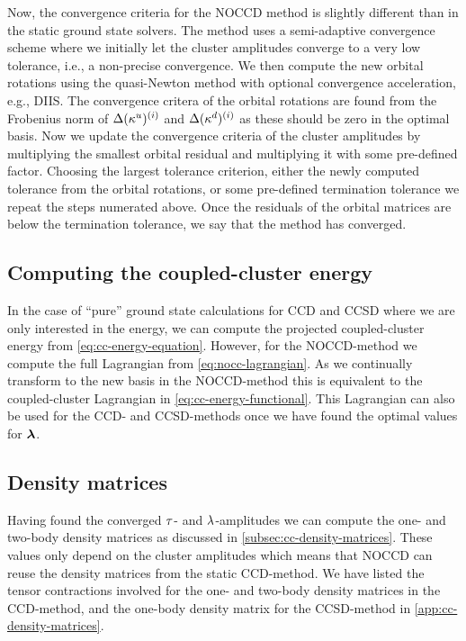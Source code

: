             Now, the convergence criteria for the NOCCD method is slightly
            different than in the static ground state solvers.
            The method uses a semi-adaptive convergence scheme where we
            initially let the cluster amplitudes converge to a very low
            tolerance, i.e., a non-precise convergence.
            We then compute the new orbital rotations using the quasi-Newton
            method with optional convergence acceleration, e.g., DIIS.
            The convergence critera of the orbital rotations are found from the
            Frobenius norm of $\Delta(\kappa^{u})^{(i)}$ and
            $\Delta(\kappa^{d})^{(i)}$ as these should be zero in the optimal
            basis.
            Now we update the convergence criteria of the cluster amplitudes by
            multiplying the smallest orbital residual and multiplying it with
            some pre-defined factor.
            Choosing the largest tolerance criterion, either the newly computed
            tolerance from the orbital rotations, or some pre-defined
            termination tolerance we repeat the steps numerated above.
            Once the residuals of the orbital matrices are below the termination
            tolerance, we say that the method has converged.

        \subsection{Computing the coupled-cluster energy}
            In the case of ``pure'' ground state calculations for CCD and CCSD
            where we are only interested in the energy, we can compute the
            projected coupled-cluster energy from
            \autoref{eq:cc-energy-equation}.
            However, for the NOCCD-method we compute the full Lagrangian from
            \autoref{eq:nocc-lagrangian}.
            As we continually transform to the new basis in the NOCCD-method
            this is equivalent to the coupled-cluster Lagrangian in
            \autoref{eq:cc-energy-functional}.
            This Lagrangian can also be used for the CCD- and CCSD-methods once
            we have found the optimal values for $\boldsymbol{\lambda}$.

        \subsection{Density matrices}
            Having found the converged $\tau$- and $\lambda$-amplitudes
            we can compute the one- and two-body density matrices as discussed
            in \autoref{subsec:cc-density-matrices}.
            These values only depend on the cluster amplitudes which means that
            NOCCD can reuse the density matrices from the static CCD-method.
            We have listed the tensor contractions involved for the one- and
            two-body density matrices in the CCD-method, and the one-body
            density matrix for the CCSD-method in
            \autoref{app:cc-density-matrices}.

